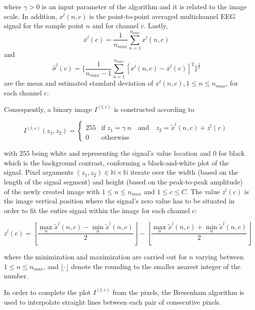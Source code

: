 \documentclass[utf8]{frontiersSCNS} %
\begin{document}
\noindent where $\gamma > 0$ is an input parameter of the algorithm and  it is related to the image scale. In addition, $ x^l(n,c) $ is the point-to-point averaged multichannel EEG signal for the sample point $n$ and for channel $c$. Lastly, $$\bar{x}^l(c) =\frac{1}{n_{max}}\sum_{n=1}^{n_{max}}x^l(n,c)$$ and $$ \hat{\sigma}^l(c) =  \bigg \{  \frac{1}{n_{max}-1}\sum_{n=1}^{n_{max}} { \left[  x^l(n,c)-\bar{x}^l(c)  \right]  }^2 \bigg \} ^{\frac{1}{2}}$$ are the mean and estimated standard deviation of $x^l(n,c), 1 \leq n \leq n_{max}$, for each channel $c$.

Consequently, a binary image $I^{(l,c)}$ is constructed according to


\begin{equation}
I^{(l,c)}(z_1,z_2) = \left\{ \begin{array}{rl}
255 & \text{if} \;  z_1 = \gamma \  n \quad \text{and}  \quad  \! z_2 = \tilde{x}^l(n,c) + z^l(c) \\
0   & \mbox{otherwise}
\end{array}\right.
\label{eq:images}
\end{equation}

\noindent with $255$ being white and representing the signal's value location and $0$ for black which is the background contrast, conforming a black-and-white plot of the signal.  Pixel arguments $ (z_1,z_2) \in \mathbb{N} \times \mathbb{N}$ iterate over the width (based on the length of the signal segment) and height (based on the peak-to-peak amplitude) of the newly created image with $1 \leq n \leq n_{max}$ and $1 \leq c \leq C$.  The value $z^l(c)$ is the image vertical position where the signal's zero value has to be situated in order to fit the entire signal within the image for each channel c:

\begin{equation}
z^l(c) = \left \lfloor{ \frac{\max_{n} \tilde{x}^l(n,c)  - \min_{n} \tilde{x}^l(n,c) }{2} }\right \rfloor -   \left \lfloor{ \frac{\max_{n} \tilde{x}^l(n,c)  + \min_{n} \tilde{x}^l(n,c)}{ 2} }\right \rfloor
\label{eq:zerolevel}
\end{equation}

\noindent where the minimization and maximization are carried out for $n$ varying between ${1 \leq n\leq n_{max}}$, and $ \lfloor \cdot  \rfloor $ denote the rounding to the smaller nearest integer of the number.
  
In order to complete the plot $I^{(l,c)}$ from the pixels, the Bresenham \citep{Bresenham1965,Ramele2016} algorithm is used to interpolate straight lines between each pair of  consecutive pixels.
\end{document}
